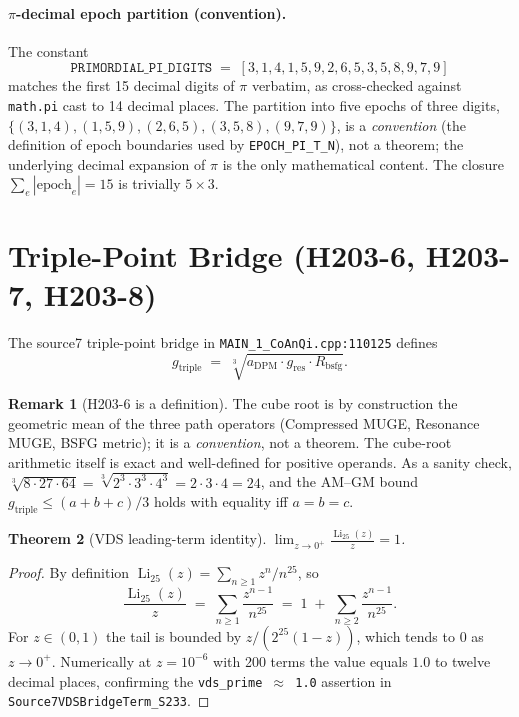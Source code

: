\documentclass[11pt,letterpaper]{article}
\theoremstyle{plain}
\newtheorem{thm}{Theorem}[section]
\theoremstyle{definition}
\newtheorem{rem}[thm]{Remark}
\begin{document}
\paragraph{$\pi$-decimal epoch partition (convention).}
The constant
\[
\texttt{PRIMORDIAL\_PI\_DIGITS} \;=\; [3,1,4,1,5,9,2,6,5,3,5,8,9,7,9]
\]
matches the first 15 decimal digits of $\pi$ verbatim, as cross-checked
against \texttt{math.pi} cast to 14 decimal places. The partition into
five epochs of three digits,
$\{(3,1,4), (1,5,9), (2,6,5), (3,5,8), (9,7,9)\}$,
is a \emph{convention} (the definition of epoch boundaries used by
\texttt{EPOCH\_PI\_T\_N}), not a theorem; the underlying decimal expansion
of $\pi$ is the only mathematical content. The closure
$\sum_e |\text{epoch}_e| = 15$ is trivially $5 \times 3$.

\section{Triple-Point Bridge (H203-6, H203-7, H203-8)}

The source7 triple-point bridge in \texttt{MAIN\_1\_CoAnQi.cpp:110125}
defines
\[
   g_{\text{triple}} \;=\; \sqrt[3]{a_{\text{DPM}} \cdot g_{\text{res}} \cdot R_{\text{bsfg}}}.
\]

\begin{rem}[H203-6 is a definition]
The cube root is by construction the geometric mean of the three path
operators (Compressed MUGE, Resonance MUGE, BSFG metric); it is a
\emph{convention}, not a theorem. The cube-root arithmetic itself is
exact and well-defined for positive operands. As a sanity check,
$\sqrt[3]{8 \cdot 27 \cdot 64} = \sqrt[3]{2^3 \cdot 3^3 \cdot 4^3}
= 2 \cdot 3 \cdot 4 = 24$, and the AM--GM bound
$g_{\text{triple}} \le (a+b+c)/3$ holds with equality iff $a = b = c$.
\end{rem}

\begin{thm}[VDS leading-term identity]
$\displaystyle \lim_{z \to 0^+} \frac{\operatorname{Li}_{25}(z)}{z} = 1$.
\end{thm}

\begin{proof}
By definition $\operatorname{Li}_{25}(z) = \sum_{n \ge 1} z^n/n^{25}$, so
\[
   \frac{\operatorname{Li}_{25}(z)}{z} \;=\; \sum_{n \ge 1} \frac{z^{n-1}}{n^{25}}
     \;=\; 1 \;+\; \sum_{n \ge 2} \frac{z^{n-1}}{n^{25}}.
\]
For $z \in (0, 1)$ the tail is bounded by
$z/(2^{25}(1-z))$, which tends to $0$ as $z \to 0^+$. Numerically at
$z = 10^{-6}$ with 200 terms the value equals $1.0$ to twelve decimal
places, confirming the \texttt{vds\_prime $\approx$ 1.0} assertion in
\texttt{Source7VDSBridgeTerm\_S233}.
\end{proof}
\end{document}
